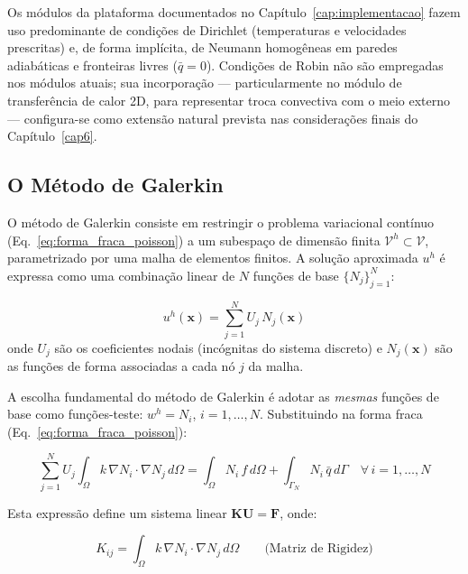 Os módulos da plataforma documentados no Capítulo~\ref{cap:implementacao} fazem uso predominante de condições de Dirichlet (temperaturas e velocidades prescritas) e, de forma implícita, de Neumann homogêneas em paredes adiabáticas e fronteiras livres ($\bar{q} = 0$). Condições de Robin não são empregadas nos módulos atuais; sua incorporação --- particularmente no módulo de transferência de calor 2D, para representar troca convectiva com o meio externo --- configura-se como extensão natural prevista nas considerações finais do Capítulo~\ref{cap6}.

\subsection{O Método de Galerkin}
\label{sec:galerkin}

O método de Galerkin consiste em restringir o problema variacional contínuo (Eq.~\ref{eq:forma_fraca_poisson}) a um subespaço de dimensão finita $\mathcal{V}^h \subset \mathcal{V}$, parametrizado por uma malha de elementos finitos. A solução aproximada $u^h$ é expressa como uma combinação linear de $N$ funções de base $\{N_j\}_{j=1}^{N}$:

\begin{equation}
u^h(\mathbf{x}) = \sum_{j=1}^{N} U_j \, N_j(\mathbf{x})
\label{eq:aproximacao_galerkin}
\end{equation}
onde $U_j$ são os coeficientes nodais (incógnitas do sistema discreto) e $N_j(\mathbf{x})$ são as funções de forma associadas a cada nó $j$ da malha.

A escolha fundamental do método de Galerkin é adotar as \textit{mesmas} funções de base como funções-teste: $w^h = N_i$, $i = 1, \ldots, N$. Substituindo na forma fraca (Eq.~\ref{eq:forma_fraca_poisson}):

\begin{equation}
\sum_{j=1}^{N} U_j \int_\Omega k \, \nabla N_i \cdot \nabla N_j \, d\Omega = \int_\Omega N_i \, f \, d\Omega + \int_{\Gamma_N} N_i \, \bar{q} \, d\Gamma \quad \forall \, i = 1, \ldots, N
\label{eq:sistema_galerkin}
\end{equation}

Esta expressão define um sistema linear $\mathbf{K} \mathbf{U} = \mathbf{F}$, onde:

\begin{equation}
K_{ij} = \int_\Omega k \, \nabla N_i \cdot \nabla N_j \, d\Omega \qquad \text{(Matriz de Rigidez)}
\label{eq:matriz_rigidez}
\end{equation}

